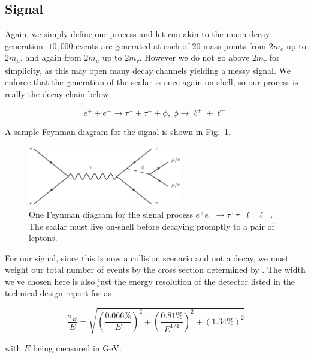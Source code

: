 \subsection{Signal}
Again, we simply define our process and let \madgraph run akin to the muon decay generation.
$10,000$ events are generated at each of $20$ mass points from $2m_e$ up to $2m_\mu$, and again from $2m_\mu$ up to $2m_\tau$.
However we do not go above $2m_\tau$ for simplicity, as this may open many decay channels yielding a messy signal.
We enforce that the generation of the scalar is once again on-shell, so our process is really the decay chain below.

\begin{equation}
    e^+ + e^- \rightarrow \tau^+ + \tau^- + \phi,~\phi \rightarrow \ell^+ + \ell^-
\end{equation}

A sample Feynman diagram for the signal is shown in Fig.\ \ref{fig:ee_tautaull_scalar}.

\begin{figure}[h]
    \centering
    \includegraphics[width=0.6\textwidth]{Figures/feynman_diagrams/ee_tautaull_scalar}
    \caption{One Feynman diagram for the signal process $e^+ e^- \rightarrow \tau^+ \tau^- \ell^+ \ell^-$. The scalar must live on-shell before decaying promptly to a pair of leptons.}
    \label{fig:ee_tautaull_scalar}
\end{figure}

For our signal, since this is now a collision scenario and not a decay, we must weight our total number of events by the cross section determined by \madgraph.
The width we've chosen here is also just the energy resolution of the detector listed in the technical design report for \belletwo \cite{Abe:2010gxa} as

\begin{equation}
    \frac{\sigma_E}{E} = \sqrt{\left(\frac{0.066\%}{E}\right)^2 + \left(\frac{0.81\%}{E^{1/4}}\right)^2 + \left(1.34\%\right)^2}
\end{equation}

\noindent with $E$ being measured in $\textrm{GeV}$.

